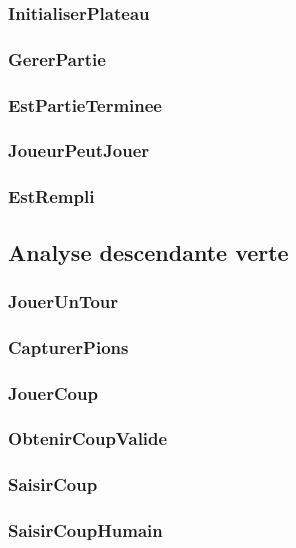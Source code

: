     \subsubsection{InitialiserPlateau}
       
    \subsubsection{GererPartie}
      
    \subsubsection{EstPartieTerminee}
      
    \subsubsection{JoueurPeutJouer}
      
    \subsubsection{EstRempli}
      
    
  \subsection{Analyse descendante verte}
    \subsubsection{JouerUnTour}
      
    \subsubsection{CapturerPions}
      
    \subsubsection{JouerCoup}
      
    \subsubsection{ObtenirCoupValide}
      
    \subsubsection{SaisirCoup}
      
    \subsubsection{SaisirCoupHumain}
      
